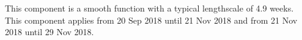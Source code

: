 This component is a smooth function with a typical lengthscale of 4.9 weeks.
This component applies from 20 Sep 2018 until 21 Nov 2018 and from 21 Nov 2018 until 29 Nov 2018.